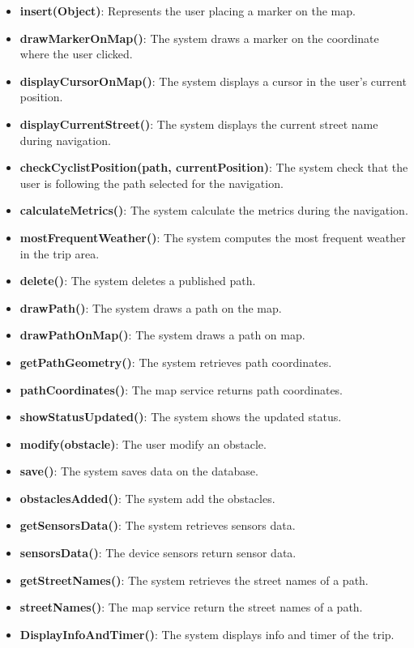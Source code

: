 \begin{itemize}
    \item \textbf{insert(Object)}: Represents the user placing a marker on the map.
    \item \textbf{drawMarkerOnMap()}: The system draws a marker on the coordinate where the user clicked.
    \item \textbf{displayCursorOnMap()}: The system displays a cursor in the user's current position.
    \item \textbf{displayCurrentStreet()}: The system displays the current street name during navigation.
    \item \textbf{checkCyclistPosition(path, currentPosition)}: The system check that the user is following the path selected for the navigation.
    \item \textbf{calculateMetrics()}: The system calculate the metrics during the navigation.
    \item \textbf{mostFrequentWeather()}: The system computes the most frequent weather in the trip area.
    \item \textbf{delete()}: The system deletes a published path.
    \item \textbf{drawPath()}: The system draws a path on the map.
    \item \textbf{drawPathOnMap()}: The system draws a path on map.
    \item \textbf{getPathGeometry()}: The system retrieves path coordinates.
    \item \textbf{pathCoordinates()}: The map service returns path coordinates.
    \item \textbf{showStatusUpdated()}: The system shows the updated status.
    \item \textbf{modify(obstacle)}: The user modify an obstacle.
    \item \textbf{save()}: The system saves data on the database.
    \item \textbf{obstaclesAdded()}: The system add the obstacles.
    \item \textbf{getSensorsData()}: The system retrieves sensors data.
    \item \textbf{sensorsData()}: The device sensors return sensor data.
    \item \textbf{getStreetNames()}: The system retrieves the street names of a path.
    \item \textbf{streetNames()}:  The map service return the street names of a path.
    \item \textbf{DisplayInfoAndTimer()}: The system displays info and timer of the trip.

\end{itemize}
